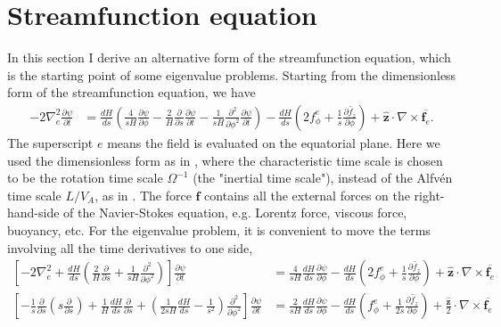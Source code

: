 \section{Streamfunction equation}

In this section I derive an alternative form of the streamfunction equation, which is the starting point of some eigenvalue problems.
Starting from the dimensionless form of the streamfunction equation, we have
\begin{equation}
\begin{aligned}
    -2 \nabla_e^2 \frac{\partial \psi}{\partial t} &= \frac{dH}{ds} \left(\frac{4}{sH} \frac{\partial \psi}{\partial \phi} - \frac{2}{H}\frac{\partial}{\partial s} \frac{\partial \psi}{\partial t} - \frac{1}{sH}\frac{\partial^2}{\partial \phi^2}\frac{\partial \psi}{\partial t}\right) - \frac{dH}{ds} \left(2 f_\phi^e + \frac{1}{s}\frac{\partial \widetilde{f_z}}{\partial \phi}\right) + \hat{\mathbf{z}}\cdot \nabla\times \overline{\mathbf{f}_e}.
\end{aligned}
\end{equation}
The superscript $e$ means the field is evaluated on the equatorial plane. Here we used the dimensionless form as in \textcite{jackson_plesio-geostrophy_2020}, where the characteristic time scale is chosen to be the rotation time scale $\Omega^{-1}$ (the "inertial time scale"), instead of the Alfvén time scale $L/V_A$, as in \textcite{holdenried-chernoff_long_2021}. The force $\mathbf{f}$ contains all the external forces on the right-hand-side of the Navier-Stokes equation, e.g. Lorentz force, viscous force, buoyancy, etc. For the eigenvalue problem, it is convenient to move the terms involving all the time derivatives to one side, 
\[\begin{aligned}
    \left[-2 \nabla_e^2 + \frac{dH}{ds} \left(\frac{2}{H} \frac{\partial}{\partial s} + \frac{1}{sH} \frac{\partial^2}{\partial \phi^2}\right)\right] \frac{\partial \psi}{\partial t} &= \frac{4}{sH}\frac{dH}{ds} \frac{\partial \psi}{\partial \phi} - \frac{dH}{ds} \left(2 f_\phi^e + \frac{1}{s}\frac{\partial \widetilde{f_z}}{\partial \phi}\right) + \hat{\mathbf{z}}\cdot \nabla\times \overline{\mathbf{f}_e} \\ 
    \left[- \frac{1}{s}\frac{\partial}{\partial s}\left(s\frac{\partial}{\partial s}\right) + \frac{1}{H} \frac{dH}{ds} \frac{\partial}{\partial s} + \left(\frac{1}{2sH} \frac{dH}{ds} - \frac{1}{s^2}\right)\frac{\partial^2}{\partial \phi^2}\right] \frac{\partial \psi}{\partial t} &= \frac{2}{sH}\frac{dH}{ds} \frac{\partial \psi}{\partial \phi} - \frac{dH}{ds} \left(f_\phi^e + \frac{1}{2s}\frac{\partial \widetilde{f_z}}{\partial \phi}\right) + \frac{\hat{\mathbf{z}}}{2}\cdot \nabla\times \overline{\mathbf{f}_e}
\end{aligned}\]
